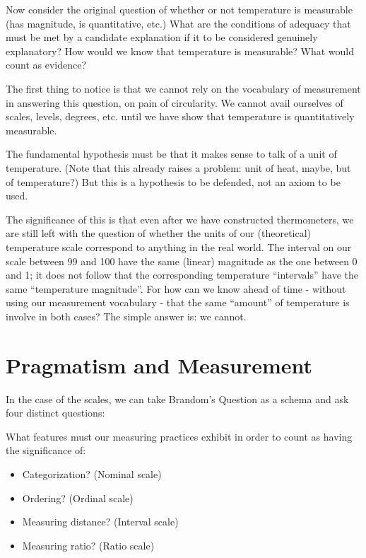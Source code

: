 \documentclass[11pt,twoside]{article}
\begin{document}
Now consider the original question of whether or not temperature is
measurable (has magnitude, is quantitative, etc.)  What are the
conditions of adequacy that must be met by a candidate explanation if
it to be considered genuinely explanatory?  How would we know that
temperature is measurable?  What would count as evidence?

The first thing to notice is that we cannot rely on the vocabulary of
measurement in answering this question, on pain of circularity.  We
cannot avail ourselves of scales, levels, degrees, etc. until we have
show that temperature is quantitatively measurable.

The fundamental hypothesis must be that it makes sense to talk of a
unit of temperature.  (Note that this already raises a problem: unit
of heat, maybe, but of temperature?)  But this is a hypothesis to be
defended, not an axiom to be used.

The significance of this is that even after we have constructed
thermometers, we are still left with the question of whether the units
of our (theoretical) temperature scale correspond to anything in the
real world.  The interval on our scale between 99 and 100 have the
same (linear) magnitude as the one between 0 and 1; it does not follow
that the corresponding temperature ``intervals'' have the same
``temperature magnitude''.  For how can we know ahead of time -
without using our measurement vocabulary - that the same ``amount'' of
temperature is involve in both cases?  The simple answer is: we cannot.

\clearpage
\section{Pragmatism and Measurement}

In the case of the scales, we can take Brandom's Question as a schema
and ask four distinct questions:

What features must our measuring practices exhibit in order to count
as having the significance of:

\begin{itemize}
\item Categorization? (Nominal scale)
\item Ordering?  (Ordinal scale)
\item Measuring distance? (Interval scale)
\item Measuring ratio? (Ratio scale)
\end{itemize}
\end{document}

